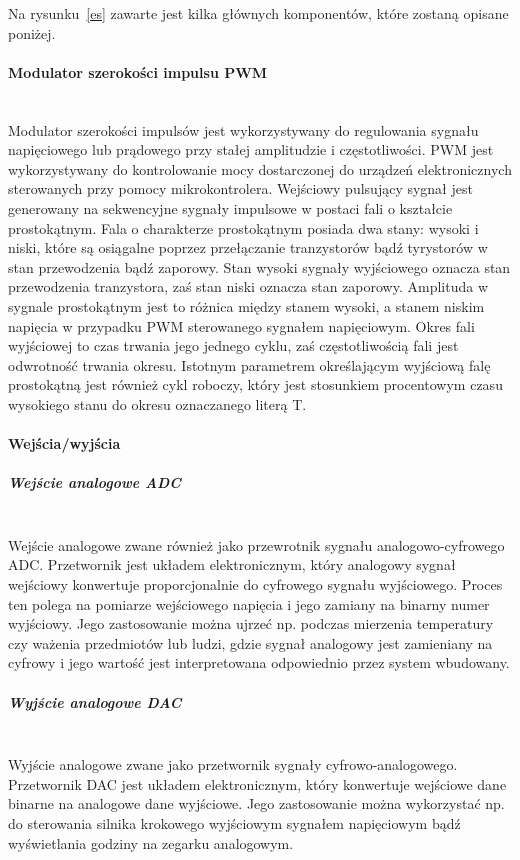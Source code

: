 \documentclass[12p]{article}
\begin{document}
Na rysunku~\ref{es} zawarte jest kilka głównych komponentów, które zostaną opisane poniżej.
\paragraph{Modulator szerokości impulsu PWM} \mbox{} \\

Modulator szerokości impulsów jest wykorzystywany do regulowania sygnału napięciowego lub prądowego przy stałej amplitudzie i częstotliwości. PWM jest wykorzystywany do kontrolowanie mocy dostarczonej do urządzeń elektronicznych sterowanych przy pomocy mikrokontrolera. Wejściowy pulsujący sygnał jest generowany na sekwencyjne sygnały impulsowe w postaci fali o kształcie prostokątnym. Fala o charakterze prostokątnym posiada dwa stany: wysoki i niski, które są osiągalne poprzez przełączanie tranzystorów bądź tyrystorów w stan przewodzenia bądź zaporowy. Stan wysoki sygnały wyjściowego oznacza stan przewodzenia tranzystora, zaś stan niski oznacza stan zaporowy. Amplituda w sygnale prostokątnym jest to różnica między stanem wysoki, a stanem niskim napięcia w przypadku PWM sterowanego sygnałem napięciowym. Okres fali wyjściowej to czas trwania jego jednego cyklu, zaś częstotliwością fali jest odwrotność trwania okresu. Istotnym parametrem określającym wyjściową falę prostokątną jest również cykl roboczy, który jest stosunkiem procentowym czasu wysokiego stanu do okresu oznaczanego literą T.

\paragraph{Wejścia/wyjścia}
\subparagraph{Wejście analogowe ADC} \mbox{} \\

Wejście analogowe zwane również jako przewrotnik sygnału analogowo-cyfrowego ADC. Przetwornik jest układem elektronicznym, który analogowy sygnał wejściowy konwertuje proporcjonalnie do cyfrowego sygnału wyjściowego. Proces ten polega na pomiarze wejściowego napięcia i jego zamiany na binarny numer wyjściowy. Jego zastosowanie można ujrzeć np. podczas mierzenia temperatury czy ważenia przedmiotów lub ludzi, gdzie sygnał analogowy jest zamieniany na cyfrowy i jego wartość jest interpretowana odpowiednio przez system wbudowany. 

\subparagraph{Wyjście analogowe DAC} \mbox{} \\

Wyjście analogowe zwane jako przetwornik sygnały cyfrowo-analogowego. Przetwornik DAC jest układem elektronicznym, który konwertuje wejściowe dane binarne na analogowe dane wyjściowe. Jego zastosowanie można wykorzystać np. do sterowania silnika krokowego wyjściowym sygnałem napięciowym bądź wyświetlania godziny na zegarku analogowym.
\end{document}
